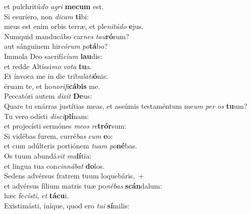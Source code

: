 \evenverse et pulchritú\textit{do} \textit{a}\textit{gri} \textbf{me}\textbf{cum} est.\\
\oddverse Si esuríero, non \textit{di}\textit{cam} \textbf{ti}bi:~\*\\
\oddverse meus est enim orbis terræ, et ple\textit{ni}\textit{tú}\textit{do} \textbf{e}jus.\\
\evenverse Numquid manducábo car\textit{nes} \textit{tau}\textbf{ró}rum?~\*\\
\evenverse aut sánguinem hir\textit{có}\textit{rum} \textit{po}\textbf{tá}bo?\\
\oddverse Immola Deo sacrifí\textit{ci}\textit{um} \textbf{lau}dis:~\*\\
\oddverse et redde Altíssi\textit{mo} \textit{vo}\textit{ta} \textbf{tu}a.\\
\evenverse Et ínvoca me in die tribu\textit{la}\textit{ti}\textbf{ó}nis:~\*\\
\evenverse éruam te, et ho\textit{no}\textit{ri}\textit{fi}\textbf{cá}\textbf{bis} me.\\
\oddverse Peccatóri autem \textit{di}\textit{xit} \textbf{De}us:~\*\\
\oddverse Quare tu enárras justítias meas, et assúmis testaméntum me\textit{um} \textit{per} \textit{os} \textbf{tu}um?\\
\evenverse Tu vero odísti \textit{di}\textit{sci}\textbf{plí}nam:~\*\\
\evenverse et projecísti sermónes \textit{me}\textit{os} \textit{re}\textbf{trór}sum:\\
\oddverse Si vidébas furem, curré\textit{bas} \textit{cum} \textbf{e}o:~\*\\
\oddverse et cum adúlteris portiónem \textit{tu}\textit{am} \textit{po}\textbf{né}bas.\\
\evenverse Os tuum abundá\textit{vit} \textit{ma}\textbf{lí}tia:~\*\\
\evenverse et lingua tua con\textit{cin}\textit{ná}\textit{bat} \textbf{do}los.\\
\oddverse Sedens advérsus fratrem tuum loquebáris,~+\\
\oddverse  et advérsus fílium matris tuæ po\textit{né}\textit{bas} \textbf{scán}dalum:~\*\\
\oddverse hæc fe\textit{cí}\textit{sti}, \textit{et} \textbf{tá}\textbf{cu}i.\\
\evenverse Existimásti, iníque, quod ero \textit{tu}\textit{i} \textbf{sí}milis:~\*\\

